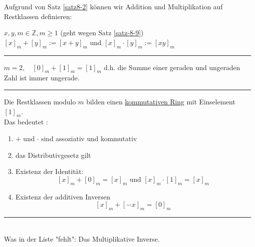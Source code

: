 \documentclass[9pt]{article}
\begin{document}
Aufgrund von Satz \ref{satz8-2} können wir Addition und Multiplikation auf Restklassen definieren: 
\begin{defi}
$x,y,m \in \mathbb{Z}, m\geq 1$ (geht wegen Satz \ref{satz-8-9}) \\
$[x]_m + [y]_m := [x+y]_m$ und $[x]_m \cdot [y]_m := [xy]_m$
\end{defi} \noindent \rule{8cm}{0.4pt}
\begin{bsp}
$m = 2, \quad [0]_m + [1]_m = [1]_m$ d.h. die Summe einer geraden und ungeraden Zahl ist immer ungerade. 
\end{bsp} \noindent \rule{8cm}{0.4pt}
\begin{satz}
Die Restklassen modulo $m$ bilden einen \underline{kommutativen Ring} mit Einselement $[1]_m$. \\
Das bedeutet :
\begin{enumerate}
    \item $+$ und $\cdot$ sind assoziativ  und kommutativ 
    \item das Distributivgesetz gilt  
    \item Existenz der Identität: \[ [x]_m + [0]_m = [x]_m \text{ und } [x]_m \cdot [1]_m = [x]_m\]
    \item Existenz der additiven Inversen 
    \[ [x]_m + [-x]_m = [0]_m \]
\end{enumerate}
 \end{satz} \noindent \rule{8cm}{0.4pt} \\
Was in der Liste "fehlt": Das Multiplikative Inverse. 
\end{document}
